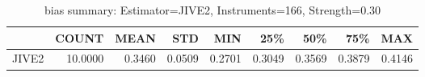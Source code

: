 \begin{table}[ht]
\centering
\caption{bias summary: Estimator=JIVE2, Instruments=166, Strength=0.30}
\begin{tabular}{lrrrrrrrr}
\toprule
 & COUNT & MEAN & STD & MIN & 25\% & 50\% & 75\% & MAX \\
\midrule
JIVE2 & 10.0000 & 0.3460 & 0.0509 & 0.2701 & 0.3049 & 0.3569 & 0.3879 & 0.4146 \\
\bottomrule
\end{tabular}
\end{table}
